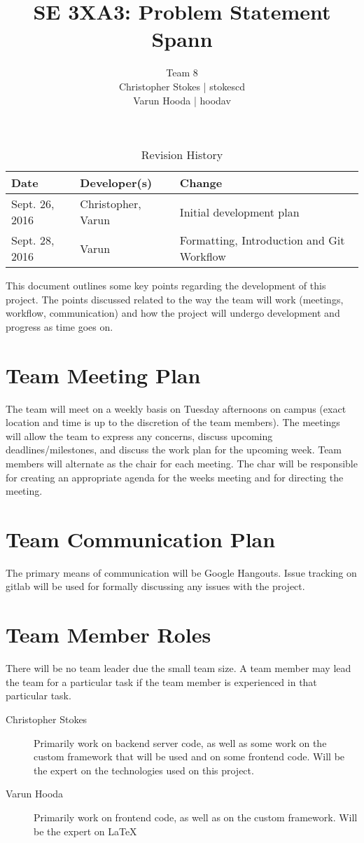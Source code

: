 \documentclass{article}
\title{SE 3XA3: Problem Statement\\Spann}
\author{Team 8
		\\ Christopher Stokes | stokescd
		\\ Varun Hooda | hoodav
}
\date{}
\begin{document}
\begin{table}[hp]
\caption{Revision History} \label{TblRevisionHistory}
\begin{tabularx}{\textwidth}{llX}
\toprule
\textbf{Date} & \textbf{Developer(s)} & \textbf{Change}\\
\midrule
    Sept. 26, 2016 & Christopher, Varun & Initial development plan\\
    Sept. 28, 2016 & Varun & Formatting, Introduction and Git Workflow\\
\bottomrule
\end{tabularx}
\end{table}

\newpage

\maketitle

This document outlines some key points regarding the development of this
project. The points discussed related to the way the team will work (meetings,
workflow, communication) and how the project will undergo development and
progress as time goes on.

\section{Team Meeting Plan}
The team will meet on a weekly basis on Tuesday afternoons on campus (exact
location and time is up to the discretion of the team members). The meetings
will allow the team to express any concerns, discuss upcoming
deadlines/milestones, and discuss the work plan for the upcoming week. Team
members will alternate as the chair for each meeting. The char will be
responsible for creating an appropriate agenda for the weeks meeting and for
directing the meeting.

\section{Team Communication Plan}
The primary means of communication will be Google Hangouts. Issue tracking on
gitlab will be used for formally discussing any issues with the project.

\section{Team Member Roles}
There will be no team leader due the small team size. A team member may lead
the team for a particular task if the team member is experienced in that
particular task.
\begin{description}
  \item[Christopher Stokes] Primarily work on backend server code, as well as
    some work on the custom framework that will be used and on some frontend
    code. Will be the expert on the technologies used on this project.
  \item[Varun Hooda] Primarily work on frontend code, as well as on the custom
    framework. Will be the expert on \LaTeX
\end{description}
\end{document}

